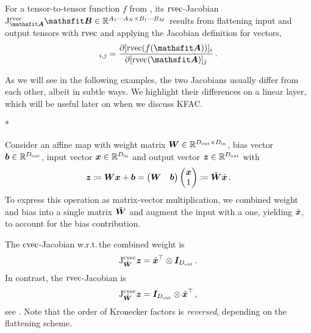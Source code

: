 \begin{definition}\label{def:rvec_jacobian}
  For a tensor-to-tensor function $f$ from , its $\operatorname{rvec}$-Jacobian $\jac^{\rvec}_{\tA}\tB \in \sR^{A_1 \cdots A_N \times B_1 \cdots B_M}$ results from flattening input and output tensors with $\operatorname{rvec}$ and applying the Jacobian definition for vectors,
  \begin{align*}
    [\jac^{\rvec}_{\tA}\tB]_{i,j}
    =
    \frac{\partial [\rvec(f(\tA))]_i}{\partial [\rvec(\tA)]_j}\,.
  \end{align*}
\end{definition}

As we will see in the following examples, the two Jacobians usually differ from each other, albeit in subtle ways. We highlight their differences on a linear layer, which will be useful later on when we discuss KFAC.

\switchcolumn[1]*
\switchcolumn[0]

\begin{example}
  Consider an affine map with weight matrix ${\bm{W}} \in {\mathbb{R}}^{D_{\text{out}} \times D_{\text{in}}}$, bias vector ${\bm{b}} \in {\mathbb{R}}^{D_{\text{out}}}$, input vector ${\bm{x}} \in {\mathbb{R}}^{D_{\text{in}}}$ and output vector ${\bm{z}} \in {\mathbb{R}}^{D_{\text{out}}}$ with
  \begin{align*}
    {\bm{z}}
    \coloneqq
    {\bm{W}} {\bm{x}} + {\bm{b}}
    =
    \begin{pmatrix}
      {\bm{W}} & {\bm{b}}
    \end{pmatrix}
    \begin{pmatrix}
      {\bm{x}} \\ 1
    \end{pmatrix}
    \coloneqq
    \tilde{{\bm{W}}}
    \tilde{{\bm{x}}}\,.
  \end{align*}
  To express this operation as matrix-vector multiplication, we combined weight and bias into a single matrix $\tilde{{\bm{W}}}$ and augment the input with a one, yielding $\tilde{{\bm{x}}}$, to account for the bias contribution.

  The $\operatorname{cvec}$-Jacobian w.r.t.\,the combined weight is
  \begin{align*}
    \mathrm{J}^{\operatorname{cvec}}_{\tilde{{\bm{W}}}}{\bm{z}}
    =
    \tilde{{\bm{x}}}^{\top}
    \otimes
    {\bm{I}}_{D_{\text{out}}}\,.
  \end{align*}
  In contrast, the $\operatorname{rvec}$-Jacobian is
  \begin{align*}
    \mathrm{J}^{\operatorname{cvec}}_{\tilde{{\bm{W}}}}{\bm{z}}
    =
    {\bm{I}}_{D_{\text{out}}}
    \otimes
    \tilde{{\bm{x}}}^{\top}\,,
  \end{align*}
  see .
  Note that the order of Kronecker factors is \emph{reversed}, depending on the flattening scheme.
\end{example}

